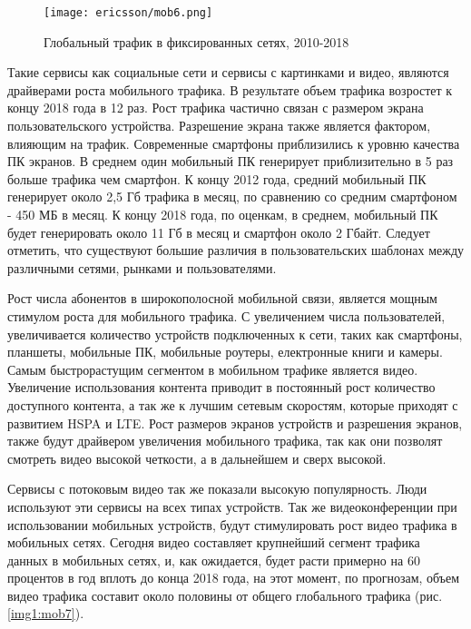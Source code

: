 \begin{figure} [h]
  \center
\texttt{[image: ericsson/mob6.png]}
  \caption{Глобальный трафик в фиксированных сетях, 2010-2018 \cite{ericsson}}
  \label{img1:mob6}
\end{figure}


Такие сервисы как социальные сети и сервисы с картинками и видео, являются драйверами роста мобильного трафика. В результате объем трафика возростет к концу 2018 года в 12 раз. Рост трафика частично связан с размером экрана пользовательского устройства. Разрешение экрана также является фактором, влияющим на трафик. Современные смартфоны приблизились к уровню качества ПК экранов. В среднем один мобильный ПК генерирует приблизительно в 5 раз больше трафика чем смартфон. К концу 2012 года, средний мобильный ПК генерирует около 2,5 Гб трафика в месяц, по сравнению со средним смартфоном - 450 МБ в месяц. К концу 2018 года, по оценкам, в среднем, мобильный ПК будет генерировать около 11 Гб в месяц и смартфон около 2 Гбайт. Следует отметить, что существуют большие различия в пользовательских шаблонах между различными сетями, рынками и пользователями.

Рост числа абонентов в широкополосной мобильной связи, является мощным стимулом роста для мобильного трафика. С увеличением числа пользователей, увеличивается количество устройств подключенных к сети, таких как смартфоны, планшеты, мобильные ПК, мобильные роутеры, електронные книги и камеры.  Самым быстрорастущим сегментом в мобильном трафике является видео. Увеличение использования контента приводит в постоянный рост количество доступного контента, а так же к лучшим сетевым скоростям, которые приходят с развитием HSPA и LTE. Рост размеров экранов устройств и разрешения экранов, также будут драйвером увеличения мобильного трафика, так как они позволят смотреть видео высокой четкости, а в дальнейшем и сверх высокой. 

Сервисы с потоковым видео так же показали высокую популярность. Люди используют эти сервисы на всех типах устройств. Так же видеоконференции при использовании мобильных устройств, будут стимулировать рост видео трафика в мобильных сетях. Сегодня видео составляет крупнейший сегмент трафика данных в мобильных сетях, и, как ожидается, будет расти примерно на 60 процентов в год вплоть до конца 2018 года, на этот момент, по прогнозам, объем видео трафика составит около половины от общего глобального трафика (рис. \ref{img1:mob7}).

